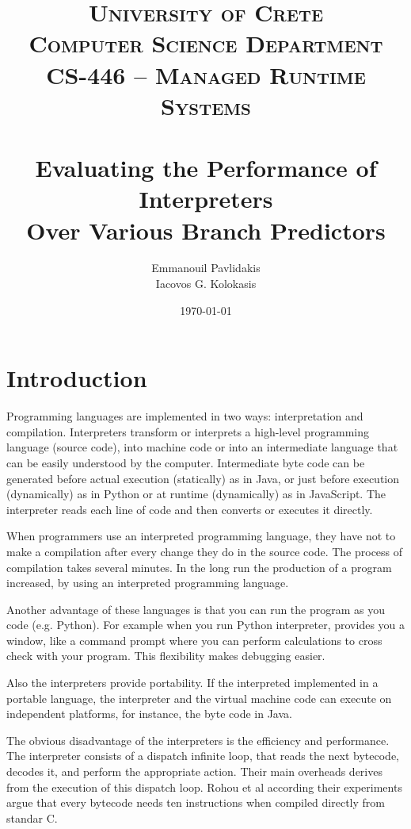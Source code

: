 \documentclass[parskip=full, paper=a4, fontsize=12pt]{scrartcl} %
\title{	
\normalfont \normalsize 
\textsc{University of Crete\\
Computer Science Department \\
CS-446 -- Managed Runtime Systems} \\ [20pt] 
\horrule{0.5pt} \\[0.4cm]
\huge
Evaluating the Performance of Interpreters\\Over Various Branch Predictors
\horrule{2pt} \\[0.5cm] 
}
\author{%
    Emmanouil Pavlidakis \\
    Iacovos G. Kolokasis%
    }
\date{\normalsize\today}
\numberwithin{equation}{section}
\numberwithin{figure}{section}
\numberwithin{table}{section}
\begin{document}
\maketitle 

\section{Introduction}

Programming languages are implemented in two ways: interpretation and
compilation. Interpreters transform or interprets a high-level
programming language (source code), into machine code or into an
intermediate language that can be easily understood by the computer.
Intermediate byte code can be generated before actual execution
(statically) as in Java, or just before execution (dynamically) as in
Python or at runtime (dynamically) as in JavaScript.  The interpreter
reads each line of code and then converts or executes it directly. 

When programmers use an interpreted programming language, they have
not to make a compilation after every change they do in the source
code.  The process of compilation takes several minutes. In the long
run the production of a program increased, by using an interpreted
programming language. 

Another advantage of these languages is that you can run the program
as you code (e.g. Python). For example when you run Python
interpreter, provides you a window, like a command prompt where you
can perform calculations to cross check with your program. This
flexibility makes debugging easier. 

Also the interpreters provide portability. If the interpreted
implemented in a portable language, the interpreter and the virtual
machine code can execute on independent platforms, for instance, the
byte code in Java.

The obvious disadvantage of the interpreters is the efficiency and
performance.  The interpreter consists of a dispatch infinite loop,
that reads the next bytecode, decodes it, and perform the appropriate
action. Their main overheads derives from the execution of this
dispatch loop. Rohou et al \cite{performance_of_interpreters}
according their experiments argue that every bytecode needs ten
instructions when compiled directly from standar C.
\end{document}
